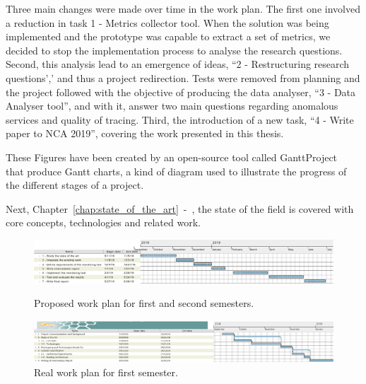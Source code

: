 Three main changes were made over time in the work plan. The first one involved a reduction in task 1 - Metrics collector tool. When the solution was being implemented and the prototype was capable to extract a set of metrics, we decided to stop the implementation process to analyse the research questions. Second, this analysis lead to an emergence of ideas, ``2 - Restructuring research questions',' and thus a project redirection. Tests were removed from planning and the project followed with the objective of producing the data analyser, ``3 - Data Analyser tool'', and with it, answer two main questions regarding anomalous services and quality of tracing. Third, the introduction of a new task, ``4 - Write paper to NCA 2019'', covering the work presented in this thesis.

These Figures have been created by an open-source tool called GanttProject~\cite{gantt_project_tool} that produce Gantt charts, a kind of diagram used to illustrate the progress of the different stages of a project.

Next, Chapter~\ref{chap:state_of_the_art}~-~, the state of the field is covered with core concepts, technologies and related work.

\begin{landscape}
    \begin{figure}
        \includegraphics[height=0.234\textwidth]{images/proposed_work_plan_semester_1_and_2.pdf}
        \caption{Proposed work plan for first and second semesters.}
        \label{fig:proposed_work_plan_semester_1_and_2}
        \includegraphics[height=0.3\textwidth]{images/real_work_plan_semester_1.pdf}
        \caption{Real work plan for first semester.}
        \label{fig:real_work_plan_semester_1}
    \end{figure}
\end{landscape}

